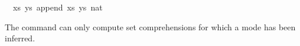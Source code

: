 \begin{isabellebody}
\isamarkupfalse%
\ {}\ {}{}{}xs{}\ ys{}{}\ append\ xs\ ys\ {}{}{}{}{}nat{}{}\ {}{}\ {}{}\ {}{}{}{}%
\endisatagquote
{\isafoldquote}%
%
\isadelimquote
%
\endisadelimquote
%
\begin{isamarkuptext}%
\noindent The \hyperlink{command.values}{\mbox{}} command can only compute set
  comprehensions for which a mode has been inferred.


\end{isamarkuptext}
\end{isabellebody}
